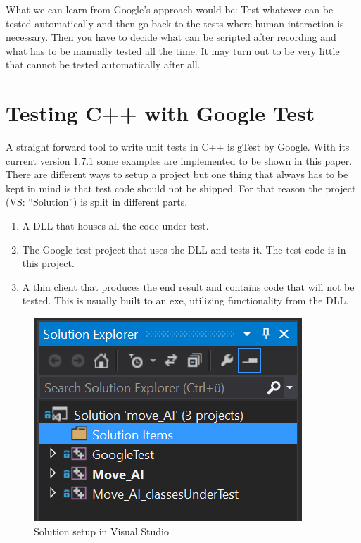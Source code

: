         What we can learn from Google's approach would be:
            Test whatever can be tested automatically and then go back to the tests where human interaction is necessary. Then you have to decide what can be scripted after recording and what has to be manually tested all the time. It may turn out to be very little that cannot be tested automatically after all.

\section{Testing C++ with Google Test} \label{sec:GoogleTest}
A straight forward tool to write unit tests in C++ is gTest by Google. With its current version 1.7.1 some examples are implemented to be shown in this paper. 
There are different ways to setup a project but one thing that always has to be kept in mind is that test code should not be shipped. 
For that reason the project (VS: ``Solution'') is split in different parts. 
    \begin{enumerate}
        \item A DLL that houses all the code under test.
        \item The Google test project that uses the DLL and tests it. The test code is in this project.
        \item A thin client that produces the end result and contains code that will not be tested. This is usually built to an exe, utilizing functionality from the DLL.
    \end{enumerate}
    \begin{figure}[hbtp]
        \centering
        \includegraphics[width=0.7\columnwidth]{img/SolutionSetup.PNG}
        \caption{Solution setup in Visual Studio}
        \label{fig:SolutionSetup}
    \end{figure}

